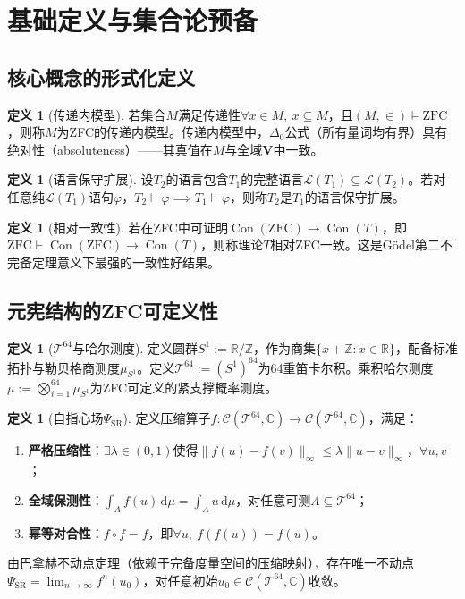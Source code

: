 \documentclass[12pt,a4paper]{article}
\newcommand{\ud}{\ensuremath{\,\mathrm{d}}}
\theoremstyle{plain}
\theoremstyle{definition}
\newtheorem{definition}[theorem]{定义}
\newcommand{\Tsixtyfour}{\mathcal{T}^{64}}
\newcommand{\R}{\mathbb{R}}
\newcommand{\C}{\mathbb{C}}
\newcommand{\Z}{\mathbb{Z}}
\newcommand{\PSR}{\Psi_{\mathrm{SR}}}
\newcommand{\ZFC}{\mathrm{ZFC}}
\newcommand{\Con}{\operatorname{Con}}
\newcommand{\V}{\mathbf{V}}
\begin{document}
\section{基础定义与集合论预备}
\label{sec:preliminaries}
 
\subsection{核心概念的形式化定义}
\begin{definition}[传递内模型]
若集合$M$满足传递性$\forall x\in M,\ x\subseteq M$，且$(M,\in)\vDash \ZFC$，则称$M$为ZFC的传递内模型。传递内模型中，$\Delta_0$公式（所有量词均有界）具有绝对性（absoluteness）——其真值在$M$与全域$\V$中一致。
\end{definition}
 
\begin{definition}[语言保守扩展]
设$T_2$的语言包含$T_1$的完整语言$\mathcal{L}(T_1)\subseteq\mathcal{L}(T_2)$。若对任意纯$\mathcal{L}(T_1)$语句$\varphi$，$T_2\vdash\varphi \implies T_1\vdash\varphi$，则称$T_2$是$T_1$的语言保守扩展。
\end{definition}
 
\begin{definition}[相对一致性]
若在ZFC中可证明$\Con(\ZFC) \to \Con(T)$，即$\ZFC \vdash \Con(\ZFC) \to \Con(T)$，则称理论$T$相对ZFC一致。这是Gödel第二不完备定理意义下最强的一致性好结果。
\end{definition}
 
\subsection{元宪结构的ZFC可定义性}
\begin{definition}[$\Tsixtyfour$与哈尔测度]
定义圆群$S^1:=\R/\Z$，作为商集$\{x+\Z:x\in\R\}$，配备标准拓扑与勒贝格商测度$\mu_{S^1}$。定义$\Tsixtyfour:=(S^1)^{64}$为64重笛卡尔积。乘积哈尔测度$\mu:=\bigotimes_{i=1}^{64}\mu_{S^1}$为ZFC可定义的紧支撑概率测度。
\end{definition}
 
\begin{definition}[自指心场$\PSR$]
定义压缩算子$f:\mathcal{C}(\Tsixtyfour,\C)\to\mathcal{C}(\Tsixtyfour,\C)$，满足：
\begin{enumerate}
   \item \textbf{严格压缩性}：$\exists \lambda\in(0,1)$使得$\|f(u)-f(v)\|_\infty \leq \lambda\|u-v\|_\infty$，$\forall u,v$；
   \item \textbf{全域保测性}：$\int_A f(u)\ud\mu = \int_A u\ud\mu$，对任意可测$A\subseteq\Tsixtyfour$；
   \item \textbf{幂等对合性}：$f\circ f = f$，即$\forall u,\ f(f(u))=f(u)$。
\end{enumerate}
由巴拿赫不动点定理（依赖于完备度量空间的压缩映射），存在唯一不动点$\PSR=\lim_{n\to\infty}f^n(u_0)$，对任意初始$u_0\in\mathcal{C}(\Tsixtyfour,\C)$收敛。
\end{definition}
 
\end{document}
